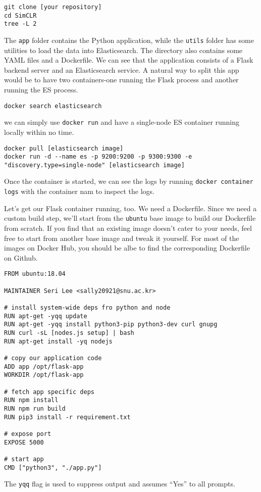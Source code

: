 \documentclass[twoside,twocolumn]{article}
\begin{document}
\begin{verbatim}
git clone [your repository]
cd SimCLR
tree -L 2
\end{verbatim}
The \texttt{app} folder contains the Python application, while the \texttt{utils} folder has some utilities to load the data into Elasticsearch.
The directory also contains some YAML files and a Dockerfile. 
We can see that the application consists of a Flask backend server and an Elasticsearch service.
A natural way to split this app would be to have two containers-one running the Flask process and another running the ES process.
\begin{verbatim}
docker search elasticsearch
\end{verbatim}
we can simply use \texttt{docker run} and have a single-node ES container running locally within no time.
\begin{verbatim}
docker pull [elasticsearch image]
docker run -d --name es -p 9200:9200 -p 9300:9300 -e "discovery.type=single-node" [elasticsearch image]
\end{verbatim}
Once the container is started, we can see the logs by running \texttt{docker container logs} with the container nam to inspect the logs.

Let's get our Flask container running, too. We need a Dockerfile. Since we need a custom build step, we'll start from the \texttt{ubuntu} base image to build our Dockerfile from scratch.
If you find that an existing image doesn't cater to your needs, feel free to start from another base image and tweak it yourself. For most of the images on Docker Hub, you should be albe to find the corresponding Dockerfile on Github.

\begin{verbatim}
FROM ubuntu:18.04

MAINTAINER Seri Lee <sally20921@snu.ac.kr>

# install system-wide deps fro python and node
RUN apt-get -yqq update
RUN apt-get -yqq install python3-pip python3-dev curl gnupg
RUN curl -sL [nodes.js setup] | bash
RUN apt-get install -yq nodejs

# copy our application code
ADD app /opt/flask-app
WORKDIR /opt/flask-app

# fetch app specific deps
RUN npm install
RUN npm run build
RUN pip3 install -r requirement.txt

# expose port 
EXPOSE 5000

# start app
CMD ["python3", "./app.py"]
\end{verbatim}
The \texttt{yqq} flag is used to suppress output and assumes ``Yes'' to all prompts.
\end{document}
